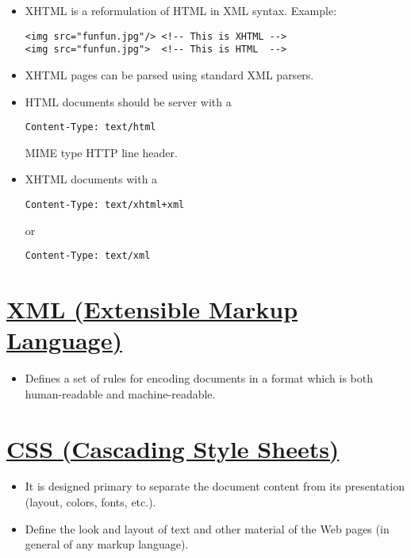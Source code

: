 \begin{itemize}

\item XHTML is a reformulation of HTML in XML syntax. Example:
\begin{lstlisting}
<img src="funfun.jpg"/> <!-- This is XHTML -->
<img src="funfun.jpg">  <!-- This is HTML  -->
\end{lstlisting}

\item XHTML pages can be parsed using standard XML parsers.

\item HTML documents should be server with a
\begin{lstlisting}
Content-Type: text/html
\end{lstlisting}
MIME type HTTP line header.

\item XHTML documents with a
\begin{lstlisting}
Content-Type: text/xhtml+xml
\end{lstlisting}
or
\begin{lstlisting}
Content-Type: text/xml
\end{lstlisting}

\end{itemize}


\section{\href{http://en.wikipedia.org/wiki/XML}{XML (Extensible Markup Language)}}

\begin{itemize}
\item Defines a set of rules for encoding documents in a format which
  is both human-readable and machine-readable.
\end{itemize}


\section{\href{http://en.wikipedia.org/wiki/Cascading_Style_Sheets}{CSS (Cascading Style Sheets)}}
\begin{itemize}
\item It is designed primary to separate the document content from its
  presentation (layout, colors, fonts, etc.).
\item Define the look and layout of text and other material of the Web
  pages (in general of any markup language).
\end{itemize}

